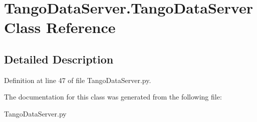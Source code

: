 \hypertarget{classTangoDataServer_1_1TangoDataServer}{
\section{TangoDataServer.TangoDataServer Class Reference}
\label{classTangoDataServer_1_1TangoDataServer}
}


\subsection{Detailed Description}


Definition at line 47 of file TangoDataServer.py.

The documentation for this class was generated from the following file:\begin{DoxyCompactItemize}
\item 
TangoDataServer.py\end{DoxyCompactItemize}
